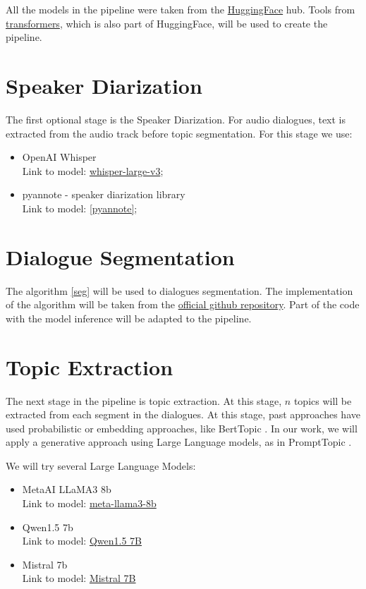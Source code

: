 \documentclass[PMI,VKR]{HSEUniversity}
\begin{document}
All the models in the pipeline were taken from the \href{https://huggingface.co/}{HuggingFace} hub. 
Tools from \href{https://huggingface.co/docs/transformers/index}{transformers}, which is also part of HuggingFace, 
will be used to create the pipeline.

\section{Speaker Diarization}

The first optional stage is the Speaker Diarization. 
For audio dialogues, text is extracted from the audio track before topic segmentation. 
For this stage we use:
\begin{itemize}
    \item OpenAI Whisper \\
    Link to model: \href{https://huggingface.co/openai/whisper-large-v3}{whisper-large-v3};
    \item pyannote - speaker diarization library \cite{pyannote:2023} \\
    Link to model: \href{https://github.com/pyannote/pyannote-audio}{[pyannote]};
\end{itemize} 

\section{Dialogue Segmentation}

The algorithm \ref{seg} will be used to dialogues segmentation. 
The implementation of the algorithm will be taken from the \href{https://github.com/lxing532/Dialogue-Topic-Segmenter}{official github repository}. 
Part of the code with the model inference will be adapted to the pipeline.

\section{Topic Extraction}

The next stage in the pipeline is topic extraction. At this stage, $n$ topics will be extracted from each segment in the dialogues. 
At this stage, past approaches have used probabilistic or embedding approaches, like BertTopic \cite{berttopic:2022}. 
In our work, we will apply a generative approach using Large Language models, as in PromptTopic \cite{prompttopic:2023}.

We will try several Large Language Models:
\begin{itemize}
    \item MetaAI LLaMA3 8b \\
    Link to model: \href{https://huggingface.co/meta-llama/Meta-Llama-3-8B-Instruct}{meta-llama3-8b}
    \item Qwen1.5 7b \\
    Link to model: \href{https://huggingface.co/Qwen/Qwen1.5-7B-Chat}{Qwen1.5 7B}
    \item Mistral 7b \\
    Link to model: \href{https://huggingface.co/mistralai/Mistral-7B-Instruct-v0.1}{Mistral 7B}
\end{itemize}  
\end{document}

